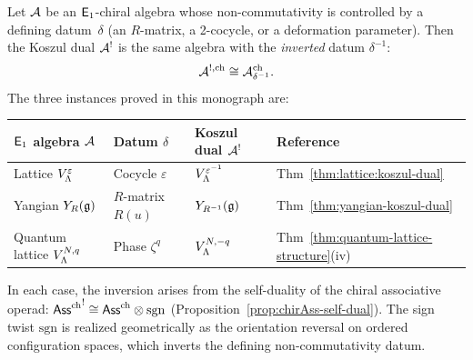\begin{theorem}
\label{thm:e1-inversion-principle}
Let $\mathcal{A}$ be an $\mathsf{E}_1$-chiral algebra whose non-commutativity
is controlled by a defining datum~$\delta$
\textup{(}an $R$-matrix, a 2-cocycle, or a deformation parameter\textup{)}.
Then the Koszul dual $\mathcal{A}^!$ is the same algebra with the
\emph{inverted} datum $\delta^{-1}$:
\begin{equation}\label{eq:e1-inversion}
\mathcal{A}^{!,\mathrm{ch}} \cong \mathcal{A}_{\delta^{-1}}^{\mathrm{ch}}.
\end{equation}
The three instances proved in this monograph are:
\begin{center}
\renewcommand{\arraystretch}{1.4}
\begin{tabular}{l l l l}
\textbf{$\mathsf{E}_1$ algebra $\mathcal{A}$} & \textbf{Datum $\delta$}
  & \textbf{Koszul dual $\mathcal{A}^!$}
  & \textbf{Reference} \\
\hline
Lattice $V_\Lambda^\varepsilon$
  & Cocycle $\varepsilon$
  & $V_\Lambda^{\varepsilon^{-1}}$
  & Thm~\ref{thm:lattice:koszul-dual} \\
Yangian $Y_R(\mathfrak{g})$
  & $R$-matrix $R(u)$
  & $Y_{R^{-1}}(\mathfrak{g})$
  & Thm~\ref{thm:yangian-koszul-dual} \\
Quantum lattice $V_\Lambda^{N,q}$
  & Phase $\zeta^q$
  & $V_\Lambda^{N,-q}$
  & Thm~\ref{thm:quantum-lattice-structure}(iv)
\end{tabular}
\end{center}

\noindent
In each case, the inversion arises from the self-duality of the
chiral associative operad:
${\mathsf{Ass}^{\mathrm{ch}}}^! \cong \mathsf{Ass}^{\mathrm{ch}} \otimes \mathrm{sgn}$
\textup{(}Proposition~\textup{\ref{prop:chirAss-self-dual})}.
The sign twist $\mathrm{sgn}$ is realized geometrically as the
orientation reversal on ordered configuration spaces, which
inverts the defining non-commutativity datum.
\end{theorem}

